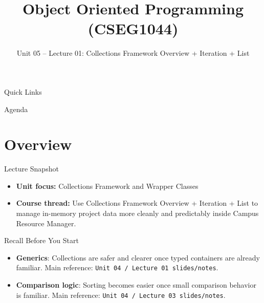 \documentclass{beamer}
\title[OOPS with Java]{Object Oriented Programming (CSEG1044)}
\subtitle{Unit 05 -- Lecture 01: Collections Framework Overview + Iteration + List}
\begin{document}
\begin{frame}[fragile]
  \titlepage
  \vspace{0.5em}
  \slidesources{\OOPSUnitVSources}
\end{frame}

\begin{frame}{Quick Links}
  \centering
  \hyperlink{sec:overview}{}\hspace{0.6em}
  \hyperlink{sec:concepts}{}\hspace{0.6em}
  \hyperlink{sec:demo}{}\hspace{0.6em}
  \hyperlink{sec:summary}{}
  \slidesources{\OOPSUnitVSources}
\end{frame}

\begin{frame}{Agenda}
  \tableofcontents
  \slidesources{\OOPSUnitVSources}
\end{frame}

\section{Overview}
\label{sec:overview}

\begin{frame}{Lecture Snapshot}
\begin{itemize}[<+->]
  \item \textbf{Unit focus:} Collections Framework and Wrapper Classes
  \item \textbf{Course thread:} Use Collections Framework Overview + Iteration + List to manage in-memory project data more cleanly and predictably inside Campus Resource Manager.
\end{itemize}
  \slidesources{\OOPSUnitVSources}
\end{frame}

\begin{frame}{Recall Before You Start}
\begin{itemize}[<+->]
  \item \textbf{Generics}: Collections are safer and clearer once typed containers are already familiar. Main reference: \texttt{Unit 04 / Lecture 01 slides/notes}.
  \item \textbf{Comparison logic}: Sorting becomes easier once small comparison behavior is familiar. Main reference: \texttt{Unit 04 / Lecture 03 slides/notes}.
\end{itemize}
  \slidesources{\OOPSUnitVSources}
\end{frame}
\end{document}
